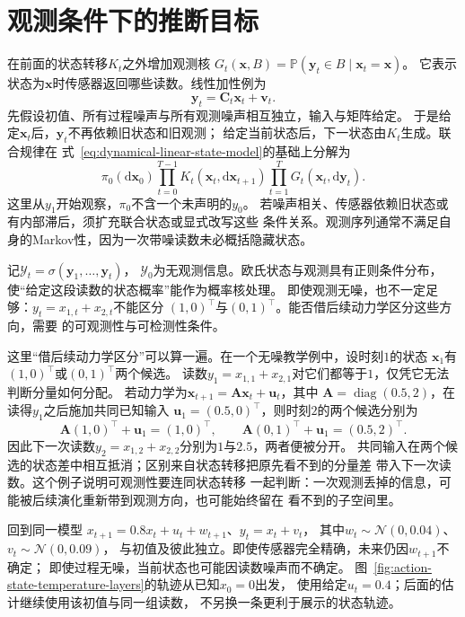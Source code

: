 \section{观测条件下的推断目标}
在前面的状态转移$K_t$之外增加观测核
$G_t(\bm x,B)=\mathbb P(\bm y_t\in B\mid\bm x_t=\bm x)$。
它表示状态为$\bm x$时传感器返回哪些读数。线性加性例为
\begin{equation}
  \bm y_t=\bm C_t\bm x_t+\bm v_t.
  \label{eq:dynamical-linear-observation-model}
\end{equation}
先假设初值、所有过程噪声与所有观测噪声相互独立，输入与矩阵给定。
于是给定$\bm x_t$后，$\bm y_t$不再依赖旧状态和旧观测；
给定当前状态后，下一状态由$K_t$生成。联合规律在
式~\eqref{eq:dynamical-linear-state-model}的基础上分解为
\[
 \pi_0(\mathrm d\bm x_0)
       \prod_{t=0}^{T-1}K_t(\bm x_t,\mathrm d\bm x_{t+1})
       \prod_{t=1}^T G_t(\bm x_t,\mathrm d\bm y_t).
\]
这里从$y_1$开始观察，$\pi_0$不含一个未声明的$y_0$。
若噪声相关、传感器依赖旧状态或有内部滞后，须扩充联合状态或显式改写这些
条件关系。观测序列通常不满足自身的Markov性，因为一次带噪读数未必概括隐藏状态。

记$\mathcal Y_t=\sigma(\bm y_1,\ldots,\bm y_t)$，
$\mathcal Y_0$为无观测信息。欧氏状态与观测具有正则条件分布，
使“给定这段读数的状态概率”能作为概率核处理。
即使观测无噪，也不一定足够：$y_t=x_{1,t}+x_{2,t}$不能区分
$(1,0)^\top$与$(0,1)^\top$。能否借后续动力学区分这些方向，需要
的可观测性与可检测性条件。

这里“借后续动力学区分”可以算一遍。在一个无噪教学例中，设时刻$1$的状态
$\bm x_1$有$(1,0)^\top$或$(0,1)^\top$两个候选。
读数$y_1=x_{1,1}+x_{2,1}$对它们都等于$1$，仅凭它无法判断分量如何分配。
若动力学为$\bm x_{t+1}=\bm A\bm x_t+\bm u_t$，其中
$\bm A=\operatorname{diag}(0.5,2)$，在读得$y_1$之后施加共同已知输入
$\bm u_1=(0.5,0)^\top$，则时刻$2$的两个候选分别为
\[
 \bm A(1,0)^\top+\bm u_1=(1,0)^\top,\qquad
 \bm A(0,1)^\top+\bm u_1=(0.5,2)^\top.
\]
因此下一次读数$y_2=x_{1,2}+x_{2,2}$分别为$1$与$2.5$，两者便被分开。
共同输入在两个候选的状态差中相互抵消；区别来自状态转移把原先看不到的分量差
带入下一次读数。这个例子说明可观测性要连同状态转移
一起判断：一次观测丢掉的信息，可能被后续演化重新带到观测方向，也可能始终留在
看不到的子空间里。

\begin{example}[带泄漏温度的间接观测]
 \label{ex:dynamical-noisy-temperature}
 回到同一模型
 $x_{t+1}=0.8x_t+u_t+w_{t+1}$、$y_t=x_t+v_t$，
 其中$w_t\sim\mathcal N(0,0.04)$、$v_t\sim\mathcal N(0,0.09)$，
 与初值及彼此独立。即使传感器完全精确，未来仍因$w_{t+1}$不确定；
 即使过程无噪，当前状态也可能因读数噪声而不确定。
 图~\ref{fig:action-state-temperature-layers}的轨迹从已知$x_0=0$出发，
 使用给定$u_t=0.4$；后面的估计继续使用该初值与同一组读数，
 不另换一条更利于展示的状态轨迹。
\end{example}

